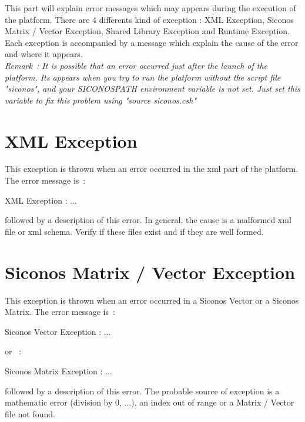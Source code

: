 
This part will explain error messages which may appears during the execution of the platform.
There are 4 differents kind of exception : XML Exception, Siconos Matrix / Vector Exception, Shared Library Exception and Runtime Exception.
Each exception is accompanied by a message which explain the cause of the error and where it appears.
\\
\textit{
Remark~: It is possible that an error occurred just after the launch of the platform. Its appears when you try to run the platform without the script file "siconos", and your SICONOSPATH environment variable is not set. Just set this variable to fix this problem using "source siconos.csh"}

\section{XML Exception}
This exception is thrown when an error occurred in the \ac{xml} part of the platform. The error message is~: \\

\begin{minipage}{\textwidth}
\small{\textsf{XML Exception : ...}}\\
\end{minipage}
followed by a description of this error.
In general, the cause is a malformed \ac{xml} file or \ac{xml} schema.
Verify if these files exist and if they are well formed.

\section{Siconos Matrix / Vector Exception}
This exception is thrown when an error occurred in a Siconos Vector or a Siconos Matrix. The error message is~: \\

\begin{minipage}{\textwidth}
\small{\textsf{Siconos Vector Exception : ...}}\\
\end{minipage}
or ~: \\

\begin{minipage}{\textwidth}
\small{\textsf{Siconos Matrix Exception : ...}}\\
\end{minipage}
followed by a description of this error. The probable source of exception is a mathematic error (division by 0, ...), an index out of range or a Matrix / Vector file not found.


